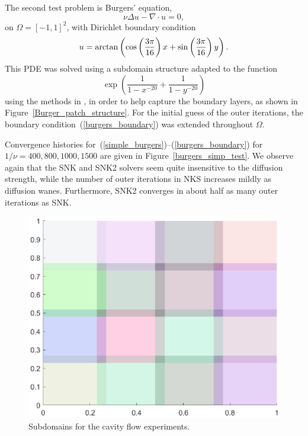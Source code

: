 The second test problem is Burgers' equation,
\begin{equation}
  \nu \Delta u - \nabla \cdot u = 0,
  \label{simple_burgers}	
\end{equation}
on $\Omega = [-1,1]^2$, with Dirichlet boundary condition
\begin{equation}
  u = \arctan \left( \cos \left( \frac{3 \pi}{16} \right) x +\sin \left( \frac{3 \pi}{16} \right) y \right).
  \label{burgers_boundary}
\end{equation}
This PDE was solved using a subdomain structure adapted to the function 
\[
  \exp\left( \frac{1}{1-x^{-20}} + \frac{1}{1-y^{-20}} \right)
\]
using the methods in \cite{AitonTA}, in order to help capture the boundary layers, as shown in Figure~\ref{Burger_patch_structure}. For the initial guess of the outer iterations, the boundary condition~(\ref{burgers_boundary}) was extended throughout $\Omega$.

Convergence histories for~(\ref{simple_burgers})--(\ref{burgers_boundary}) for $1/\nu = 400,800,1000,1500$ are given in Figure~\ref{burgers_simp_test}. We observe again that the SNK and SNK2 solvers seem quite insensitive to the diffusion strength, while the number of outer iterations in NKS increases mildly as diffusion wanes. Furthermore, SNK2 converges in about half as many outer iterations as SNK. 

\begin{figure}
	\centering
	\includegraphics[scale = 0.6 ]{Chapter3/cavity_flow_domains}
	\caption{Subdomains for the cavity flow experiments.}
	\label{Cavity_patch_structure}
\end{figure}

